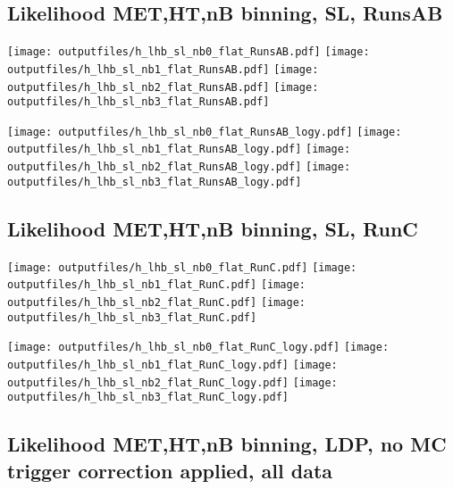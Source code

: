 \documentclass[11pt]{article}
\begin{document}
    \clearpage

    \subsection{ Likelihood MET,HT,nB binning, SL, RunsAB}

    \noindent
     \texttt{[image: outputfiles/h\_lhb\_sl\_nb0\_flat\_RunsAB.pdf]}
     \texttt{[image: outputfiles/h\_lhb\_sl\_nb1\_flat\_RunsAB.pdf]}
     \texttt{[image: outputfiles/h\_lhb\_sl\_nb2\_flat\_RunsAB.pdf]}
     \texttt{[image: outputfiles/h\_lhb\_sl\_nb3\_flat\_RunsAB.pdf]}

    \noindent
     \texttt{[image: outputfiles/h\_lhb\_sl\_nb0\_flat\_RunsAB\_logy.pdf]}
     \texttt{[image: outputfiles/h\_lhb\_sl\_nb1\_flat\_RunsAB\_logy.pdf]}
     \texttt{[image: outputfiles/h\_lhb\_sl\_nb2\_flat\_RunsAB\_logy.pdf]}
     \texttt{[image: outputfiles/h\_lhb\_sl\_nb3\_flat\_RunsAB\_logy.pdf]}

    \clearpage

    \subsection{ Likelihood MET,HT,nB binning, SL, RunC}

    \noindent
     \texttt{[image: outputfiles/h\_lhb\_sl\_nb0\_flat\_RunC.pdf]}
     \texttt{[image: outputfiles/h\_lhb\_sl\_nb1\_flat\_RunC.pdf]}
     \texttt{[image: outputfiles/h\_lhb\_sl\_nb2\_flat\_RunC.pdf]}
     \texttt{[image: outputfiles/h\_lhb\_sl\_nb3\_flat\_RunC.pdf]}

    \noindent
     \texttt{[image: outputfiles/h\_lhb\_sl\_nb0\_flat\_RunC\_logy.pdf]}
     \texttt{[image: outputfiles/h\_lhb\_sl\_nb1\_flat\_RunC\_logy.pdf]}
     \texttt{[image: outputfiles/h\_lhb\_sl\_nb2\_flat\_RunC\_logy.pdf]}
     \texttt{[image: outputfiles/h\_lhb\_sl\_nb3\_flat\_RunC\_logy.pdf]}

    \clearpage






    \subsection{ Likelihood MET,HT,nB binning, LDP, no MC trigger correction applied, all data}
\end{document}
